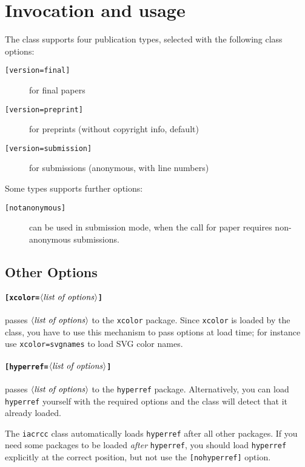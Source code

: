 \documentclass{iacrcc}
\begin{document}
\section{Invocation and usage}

The class supports four publication types, selected with the
following class options:
\begin{description}
\item[\texttt{[version=final]}] for final papers
\item[\texttt{[version=preprint]}] for preprints (without copyright info, default)
\item[\texttt{[version=submission]}] for submissions (anonymous, with line numbers)
\end{description}
Some types supports further options:
\begin{description}
\item[\texttt{[notanonymous]}] can be used in submission mode, when the
  call for paper requires non-anonymous submissions.
\end{description}

\subsection{Other Options}

\paragraph{\texttt{[xcolor=$\langle\text{\emph{list of options}}\rangle$]}}
passes $\langle\text{\emph{list of options}}\rangle$ to the
\texttt{xcolor} package.  Since \texttt{xcolor} is loaded by the class,
you have to use this mechanism to pass options at load time; for instance
use \texttt{xcolor=svgnames} to load SVG color names.

\paragraph{\texttt{[hyperref=$\langle\text{\emph{list of options}}\rangle$]}}
passes $\langle\text{\emph{list of options}}\rangle$ to the
\texttt{hyperref} package.  Alternatively, you can load
\texttt{hyperref} yourself with the required options and the class will
detect that it already loaded.

The \texttt{iacrcc} class automatically loads \texttt{hyperref}
after all other packages.  If you need some packages to be loaded
\emph{after} \texttt{hyperref}, you should load \texttt{hyperref}
explicitly at the correct position, but not use the \texttt{[nohyperref]} option.
\end{document}
